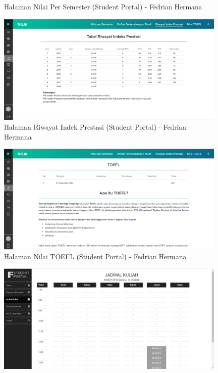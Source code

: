 \begin{itemize}
\begin{enumerate}
\begin{figure}[H]
			\caption{Halaman Nilai Per Semester (Student Portal) - Fedrian Hermana}
			\label{fig:2014_1_nps_studentportal}
		\end{figure}
		\begin{figure}[H]
			\centering
			\includegraphics[scale=0.45]{Gambar/HasilPengujian/2014_1_rip_studentportal}
			\caption{Halaman Riwayat Indek Prestasi (Student Portal) - Fedrian Hermana}
			\label{fig:2014_1_rip_studentportal}
		\end{figure}
		\begin{figure}[H]
			\centering
			\includegraphics[scale=0.45]{Gambar/HasilPengujian/2014_1_toefl_studentportal}
			\caption{Halaman Nilai TOEFL (Student Portal) - Fedrian Hermana}
			\label{fig:2014_1_toefl_studentportal}
		\end{figure}
		\begin{figure}[H]
			\centering
			\includegraphics[scale=0.45]{Gambar/HasilPengujian/2014_1_jadwal_kuliah_ifstudentportal}

\end{figure}
\end{enumerate}
\end{itemize}
